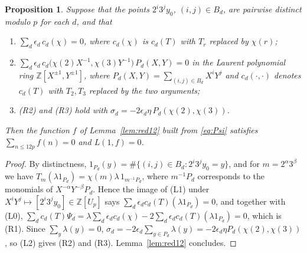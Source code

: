 \documentclass[11pt,a4paper]{article}
\newtheorem{proposition}[theorem]{Proposition}
\theoremstyle{definition}
\theoremstyle{remark}
\newcommand{\Z}{\mathbb{Z}}
\begin{document}
\begin{proposition}\label{prop:cert}
Suppose that the points $2^i3^jy_0$, $(i,j)\in B_d$, are pairwise distinct modulo $p$ for each $d$, and that
\begin{enumerate}
\item[\textup{(L0)}] $\sum_d\epsilon_d\,c_d(\chi)=0$, where $c_d(\chi)$ is $c_d(T)$ with $T_r$ replaced by $\chi(r)$;
\item[\textup{(L1)}] $\sum_d\epsilon_d\,c_d\bigl(\chi(2)X^{-1},\chi(3)Y^{-1}\bigr)\,P_d(X,Y)=0$ in the Laurent polynomial ring $\Z[X^{\pm1},Y^{\pm1}]$, where $P_d(X,Y)=\sum_{(i,j)\in B_d}X^iY^j$ and $c_d(\cdot,\cdot)$ denotes $c_d(T)$ with $T_2,T_3$ replaced by the two arguments;
\item[\textup{(L2)}] \textup{(R2)} and \textup{(R3)} hold with $\sigma_d=-2\epsilon_d\eta\,P_d(\chi(2),\chi(3))$.
\end{enumerate}
Then the function $f$ of Lemma~\ref{lem:red12} built from \eqref{eq:Psi} satisfies $\sum_{n\le 12p}f(n)=0$ and $L(1,f)=0$.
\end{proposition}

\begin{proof}
By distinctness, $1_{P_d}(y)=\#\{(i,j)\in B_d:2^i3^jy_0=y\}$, and for $m=2^\alpha3^\beta$ we have $T_m(\lambda 1_{P_d})=\chi(m)\lambda\,1_{m^{-1}P_d}$, where $m^{-1}P_d$ corresponds to the monomials of $X^{-\alpha}Y^{-\beta}P_d$. Hence the image of (L1) under $X^iY^j\mapsto[2^i3^jy_0]\in\Z[U_p]$ says $\sum_d\epsilon_dc_d(T)(\lambda1_{P_d})=0$, and together with (L0),
$\sum_dc_d(T)\Psi_d=\lambda\sum_d\epsilon_dc_d(\chi)-2\sum_d\epsilon_dc_d(T)(\lambda1_{P_d})=0$, which is (R1). Since $\sum_y\lambda(y)=0$, $\sigma_d=-2\epsilon_d\sum_{y\in P_d}\lambda(y)=-2\epsilon_d\eta P_d(\chi(2),\chi(3))$, so (L2) gives (R2) and (R3). Lemma~\ref{lem:red12} concludes.
\end{proof}
\end{document}
